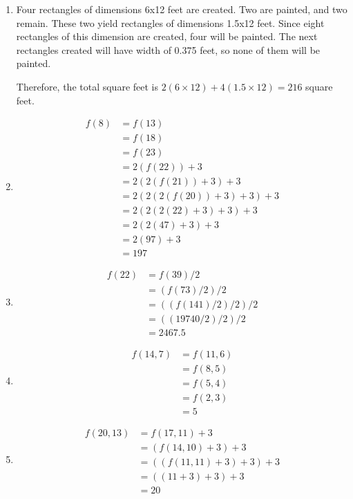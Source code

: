 \documentclass[12pt,letterpaper,fleqn]{article}
\begin{document}
\begin{enumerate}

\item Four rectangles of dimensions 6x12 feet are created.
  Two are painted, and two remain.
  These two yield rectangles of dimensions 1.5x12 feet.
  Since eight rectangles of this dimension are created, four will be painted.
  The next rectangles created will have width of 0.375 feet, so none of them will be painted.

  Therefore, the total square feet is $2(6\times 12) + 4(1.5\times 12) = 216$ square feet.

\item \begin{align*}
  f(8) &= f(13) \\
  &= f(18) \\
  &= f(23) \\
  &= 2(f(22)) + 3 \\
  &= 2(2(f(21)) + 3) + 3 \\
  &= 2(2(2(f(20)) + 3) + 3) + 3 \\
  &= 2(2(2(22) + 3) + 3) + 3 \\
  &= 2(2(47) + 3) + 3 \\
  &= 2(97) + 3 \\
  &= 197
\end{align*}

\item \begin{align*}
  f(22) &= f(39) / 2 \\
  &= (f(73) / 2) / 2 \\
  &= ((f(141) / 2) / 2) / 2 \\
  &= ((19740 / 2) / 2) / 2 \\
  &= 2467.5
\end{align*}

\item \begin{align*}
  f(14, 7) &= f(11, 6) \\
  &= f(8, 5) \\
  &= f(5, 4) \\
  &= f(2, 3) \\
  &= 5
\end{align*}

\item \begin{align*}
  f(20, 13) &= f(17, 11) + 3 \\
  &= (f(14, 10) + 3) + 3 \\
  &= ((f(11, 11) + 3) + 3) + 3 \\
  &= ((11 + 3) + 3) + 3 \\
  &= 20
\end{align*}

\end{enumerate}
\end{document}

